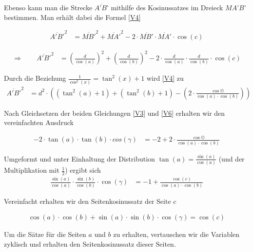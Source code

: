 \begin{refsection}
Ebenso kann man die Strecke $\overline{A’B’}$ mithilfe des Kosinussatzes im Dreieck $MA’B’$ bestimmen. Man erhält dabei die Formel \eqref{V4}

\begin{align*}
\overline{A'B'}^{2} &= \overline{MB'}^{2} + \overline{MA'}^{2} - 2\cdot \overline{MB'} \cdot \overline{MA'} \cdot \cos(c)
\end{align*}

\begin{align}
\Rightarrow \quad \quad
\overline{A'B'}^{ 2 } &= \left(\frac{ d }{\cos(a) }  \right)^{ 2 } + \left(\frac{ d }{\cos(b)}  \right)^{ 2 } - 2 \cdot \frac{ d }{\cos(a)} \cdot \frac{ d }{\cos(b)} \cdot \cos(c) 
\label{V4}
\end{align}

Durch die Beziehung $\frac{1}{\cos^{2}(x)}=\tan^{2}(x)+1$ wird \eqref{V4} zu 
\begin{align}
\overline{ A'B'}^{ 2 } &= d^{ 2 } \cdot \left(\left(\tan^{ 2 }(a) + 1\right) + \left(\tan^{ 2 }(b) + 1\right) - \left(2 \cdot \frac{\cos©}{\cos(a) \cdot \cos(b)}\right)\right)
\label {V6}
\end{align}

Nach Gleichsetzen der beiden Gleichungen \eqref{V3} und \eqref{V6} erhalten wir den vereinfachten Ausdruck 

\begin{align*}
-2 \cdot \tan(a) \cdot \tan(b) \cdot cos(\gamma) &= -2+2 \cdot \frac{\cos©}{\cos(a) \cdot \cos(b)}
\end{align*}


Umgeformt und unter Einhaltung der Distribution $\tan(a)=\frac{\sin(a)}{\cos(a)}$ (und der Multiplikation mit $\frac{1}{2}$) ergibt sich
\begin{align*}
\frac{\sin(a)}{\cos(a)} \cdot \frac{\sin(b)}{\cos(b)} \cdot \cos(\gamma) &= -1 + \frac{\cos(c)}{\cos(a) \cdot \cos(b)}
\end{align*}

Vereinfacht erhalten wir den Seitenkosinussatz der Seite $c$

\begin{align*}
\cos(a) \cdot \cos(b) + \sin(a) \cdot \sin(b) \cdot \cos(\gamma) = \cos(c)
\end{align*}

Um die Sätze für die Seiten $a$ und $b$ zu erhalten, vertauschen wir die Variablen zyklisch und erhalten den Seitenkosinussatz dieser Seiten.


\end{refsection}
